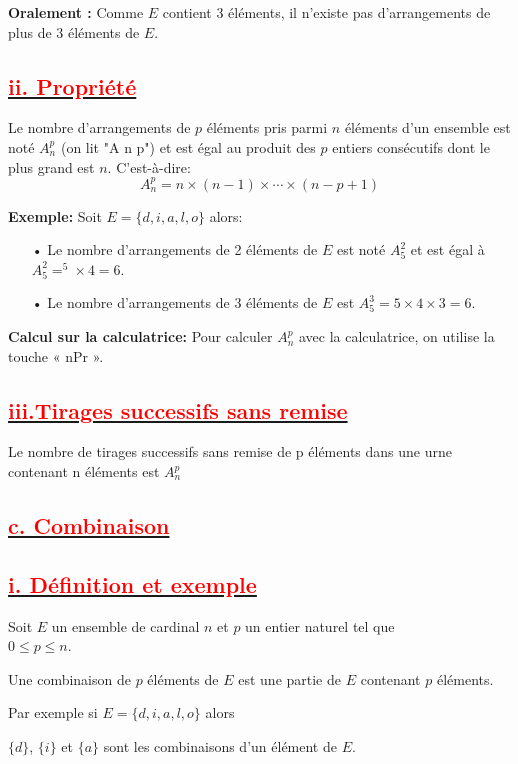 \documentclass[12pt]{article}
\begin{document}
\textbf{Oralement :} Comme \( E \) contient 3 éléments, il n’existe pas d’arrangements de plus de 3 éléments de \( E \).
\subsection*{\underline{\textbf{\textcolor{red}{ii. Propriété}}}}
Le nombre d'arrangements de \( p \) éléments pris parmi \( n \) éléments d'un ensemble est noté \( A_n^p \) (on lit "A n p") et est égal au produit des \( p \) entiers consécutifs dont le plus grand est \( n \). C'est-à-dire:
\[
A_n^p = n \times (n-1) \times \cdots \times (n-p+1)
\]

\textbf{Exemple:}
Soit \( E = \{d, i, a, l, o\} \) alors:
\begin{itemize}
    \item[•] Le nombre d'arrangements de 2 éléments de \( E \) est noté \( A_5^2 \) et est égal à \( A_5^2 =^5\times 4 = 6 \).
    \item[•] Le nombre d'arrangements de 3 éléments de \( E \) est \( A_5^3 = 5 \times 4 \times 3 = 6 \).
\end{itemize}

\textbf{Calcul sur la calculatrice:}
Pour calculer \( A_n^p \) avec la calculatrice, on utilise la touche « nPr ».
\subsection*{\underline{\textbf{\textcolor{red}{iii.Tirages successifs sans remise}}}}
Le nombre de tirages successifs sans remise de p éléments dans une urne contenant n 
éléments est $A_{n}^{p}$
\subsection*{\underline{\textbf{\textcolor{red}{c. Combinaison}}}}
\subsection*{\underline{\textbf{\textcolor{red}{i. Définition et exemple }}}}
Soit $E$ un ensemble de cardinal $n$ et $p$ un entier naturel tel que\\ $0 \leq p \leq n$.

Une combinaison de  $p$ éléments de $E$ est une partie de $E$ contenant $p$ éléments.

Par exemple si $E = \{d, i, a, l, o\}$ alors

$\{d\}$, $\{i\}$ et $\{a\}$ sont les combinaisons d'un élément de $E$.
\end{document}
